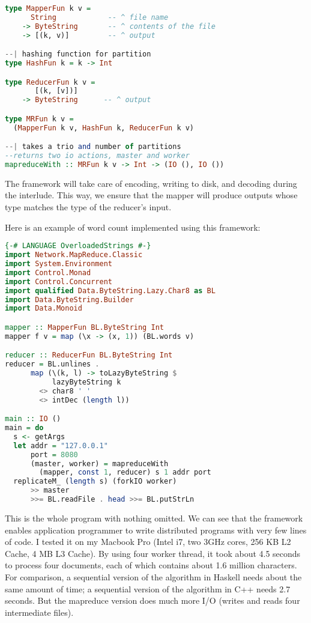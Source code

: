 \documentclass[a4paper]{article}
\begin{document}
\begin{lstlisting}[language=haskell]
type MapperFun k v = 
      String            -- ^ file name
    -> ByteString       -- ^ contents of the file
    -> [(k, v)]         -- ^ output

--| hashing function for partition
type HashFun k = k -> Int  

type ReducerFun k v = 
       [(k, [v])]
    -> ByteString      -- ^ output

type MRFun k v = 
  (MapperFun k v, HashFun k, ReducerFun k v)

--| takes a trio and number of partitions
--returns two io actions, master and worker
mapreduceWith :: MRFun k v -> Int -> (IO (), IO ())
\end{lstlisting}

The framework will take care of encoding, writing to disk, and 
decoding during the interlude.
This way, we ensure that the mapper will
produce outputs whose type matches 
the type of the reducer's input.

Here is an example of word count implemented using this framework:
\begin{lstlisting}[language=haskell]
{-# LANGUAGE OverloadedStrings #-}
import Network.MapReduce.Classic
import System.Environment
import Control.Monad
import Control.Concurrent
import qualified Data.ByteString.Lazy.Char8 as BL
import Data.ByteString.Builder
import Data.Monoid

mapper :: MapperFun BL.ByteString Int
mapper f v = map (\x -> (x, 1)) (BL.words v)

reducer :: ReducerFun BL.ByteString Int
reducer = BL.unlines . 
      map (\(k, l) -> toLazyByteString $ 
           lazyByteString k 
        <> char8 ' ' 
        <> intDec (length l))

main :: IO ()
main = do
  s <- getArgs
  let addr = "127.0.0.1"
      port = 8080
      (master, worker) = mapreduceWith
        (mapper, const 1, reducer) s 1 addr port
  replicateM_ (length s) (forkIO worker)
      >> master 
      >>= BL.readFile . head >>= BL.putStrLn
\end{lstlisting}

This is the whole program with nothing omitted. We can see
that the framework enables application programmer to write distributed 
programs with very few lines of code. I tested it 
on my Macbook Pro (Intel i7, two 3GHz cores, 256 KB L2 Cache, 4 MB L3 Cache). By using four worker thread,
it took about 4.5 seconds to process
four documents, each of which contains about 1.6 million characters.
For comparison, a sequential version of the algorithm in Haskell
needs about the same amount of time; 
a sequential version of the algorithm in C++
needs 2.7 seconds.
But the mapreduce version does 
much more I/O (writes and reads four intermediate files).
\end{document}
